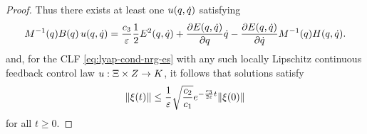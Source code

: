 \begin{proof}
  Thus there exists at least one $u(q, \dot{q})$ satisfying
  \begin{align*}
    M^{-1}(q) B(q) \, u(q, \dot{q}) = \frac{c_{3}}{\varepsilon} \frac{1}{2}
    E^{2}(q, \dot{q}) + \frac{\partial{E(q, \dot{q})}}{\partial{q}} \dot{q} - \frac{\partial{E(q, \dot{q})}}{\partial{\dot{q}}}
    M^{-1}(q) H(q, \dot{q}).
  \end{align*}
  and, for the CLF \eqref{eq:lyap-cond-nrg-es} with any such locally Lipschitz
  continuous feedback control law $u : \Xi \times Z \to K$, it follows that
  solutions satisfy
  \begin{align}
    \label{eq:xt-bounds}
    \| \xi(t) \| \leq \frac{1}{\varepsilon} \sqrt{\frac{c_{2}}{c_{1}}}
    e^{-\frac{c_{3}}{2\varepsilon} t} \| \xi(0) \|
  \end{align}
  for all $t \geq 0.$
\end{proof}


